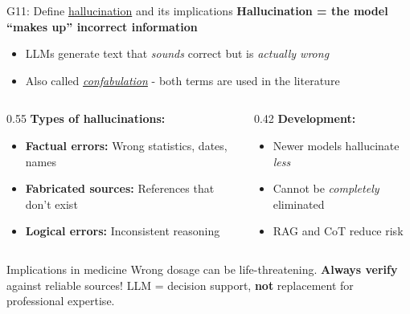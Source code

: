 \documentclass[aspectratio=169, 10pt]{beamer}
\begin{document}
\begin{frame}{G11: Define \href{https://en.wikipedia.org/wiki/Hallucination_(artificial_intelligence)}{hallucination} and its implications}
    \textbf{Hallucination = the model ``makes up'' incorrect information}
    \begin{itemize}
        \item LLMs generate text that \textit{sounds} correct but is \textit{actually wrong}
        \item Also called \href{https://en.wikipedia.org/wiki/Confabulation_(neural_networks)}{\textit{confabulation}} - both terms are used in the literature
    \end{itemize}

    \vspace{0.15cm}
    \begin{columns}[T]
        \begin{column}{0.55\textwidth}
            \textbf{Types of hallucinations:}
            \footnotesize
            \begin{itemize}
                \item \textbf{Factual errors:} Wrong statistics, dates, names
                \item \textbf{Fabricated sources:} References that don't exist
                \item \textbf{Logical errors:} Inconsistent reasoning
            \end{itemize}
        \end{column}
        \begin{column}{0.42\textwidth}
            \textbf{Development:}
            \footnotesize
            \begin{itemize}
                \item Newer models hallucinate \textit{less}
                \item Cannot be \textit{completely} eliminated
                \item RAG and CoT reduce risk
            \end{itemize}
        \end{column}
    \end{columns}

    \vspace{0.1cm}
    \begin{alertblock}{\footnotesize Implications in medicine}
        \footnotesize
        Wrong dosage can be life-threatening. \textbf{Always verify} against reliable sources! LLM = decision support, \textbf{not} replacement for professional expertise.
    \end{alertblock}
\end{frame}
\end{document}
